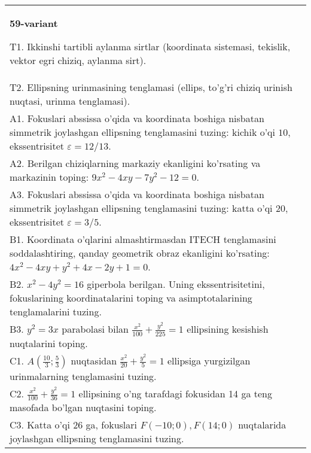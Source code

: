 \documentclass{article}
\begin{document}
\begin{tabular}{m{17cm}}
\textbf{59-variant}
\newline

T1. Ikkinshi tartibli aylanma sirtlar (koordinata sistemasi, tekislik, vektor egri chiziq, aylanma sirt).\\

T2. Ellipsning urinmasining tenglamasi (ellips, to'g'ri chiziq urinish nuqtasi, urinma tenglamasi).\\

A1. Fokuslari abssissa o'qida va koordinata boshiga nisbatan simmetrik joylashgan ellipsning tenglamasini tuzing: kichik o'qi $10$, ekssentrisitet $\varepsilon=12/13$.\\

A2. Berilgan chiziqlarning markaziy ekanligini ko'rsating va markazinin toping: $9x^{2}-4xy-7y^{2}-12=0$.\\

A3. Fokuslari abssissa o'qida va koordinata boshiga nisbatan simmetrik joylashgan ellipsning tenglamasini tuzing: katta o'qi $20$, ekssentrisitet $\varepsilon=3/5$.\\

B1. Koordinata o'qlarini almashtirmasdan ITECH tenglamasini soddalashtiring, qanday geometrik obraz ekanligini ko'rsating: $4x^{2} - 4xy + y^{2} + 4x - 2y + 1 = 0$.  \\

B2. $x^{2} - 4y^{2} = 16$ giperbola berilgan. Uning ekssentrisitetini, fokuslarining koordinatalarini toping va asimptotalarining tenglamalarini tuzing.\\

B3. $y^{2} = 3x$ parabolasi bilan $\frac{x^{2}}{100} + \frac{y^{2}}{225} = 1$ ellipsining kesishish nuqtalarini toping.  \\

C1. $A(\frac{10}{3};\frac{5}{3})$ nuqtasidan $\frac{x^{2}}{20} + \frac{y^{2}}{5} = 1$ ellipsiga yurgizilgan urinmalarning tenglamasini tuzing.  \\

C2. $\frac{x^{2}}{100} + \frac{y^{2}}{36} = 1$ ellipsining o'ng tarafdagi fokusidan 14 ga teng masofada bo'lgan nuqtasini toping.  \\

C3. Katta o'qi 26 ga, fokuslari $F( - 10;0), F(14;0)$ nuqtalarida joylashgan ellipsning tenglamasini tuzing.  \\

\end{tabular}
\vspace{1cm}
\end{document}
